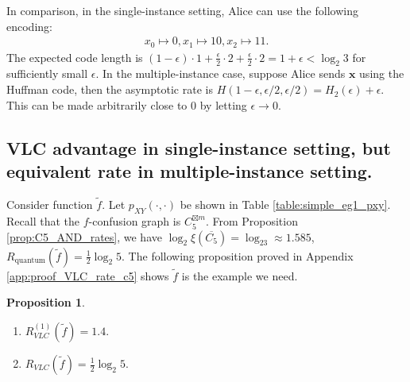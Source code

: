 \documentclass[journal, onecolumn, draftcls]{IEEEtran}
\theoremstyle{definition}
\newtheorem{proposition}{Proposition}
\newcommand{\bfx}{\mathbf{x}}
\newcommand{\aditya}[1]{\marginpar{+}{\bf Aditya's remark}: {\em #1}}
\begin{document}
In comparison, in the single-instance setting, Alice can use the following encoding:
\begin{align*}
    x_0\mapsto 0, x_1\mapsto 10, x_2\mapsto 11. 
\end{align*}
The expected code length is $(1-\epsilon)\cdot 1 + \frac{\epsilon}{2}\cdot 2+ \frac{\epsilon}{2}\cdot 2 = 1+\epsilon < \log_2 3$ for sufficiently small $\epsilon$. In the multiple-instance case, suppose Alice sends $\bfx$ using the Huffman code, then the asymptotic rate is $H(1-\epsilon,\epsilon/2,\epsilon/2) = H_2(\epsilon) + \epsilon$. This can be made arbitrarily close to $0$ by letting $\epsilon \to 0$.

\subsection{VLC advantage in single-instance setting, but equivalent rate  in multiple-instance setting.\label{sec:VLC_C5_AND}}
Consider function $\tilde f$. Let $p_{XY}(\cdot,\cdot)$  be shown in Table \ref{table:simple_eg1_pxy}. Recall that the $f$-confusion graph is $C_5^{\boxtimes m}$. From Proposition \ref{prop:C5_AND_rates}, we have $\log_2\xi(\overline{C_5}) =\log_23\approx 1.585$, $R_{\text{quantum}}(\tilde f)  =\frac{1}{2}\log_2 5$. The following proposition proved in Appendix \ref{app:proof_VLC_rate_c5} shows $\tilde f$ is the example we need.
\begin{proposition}\label{prop:VLC_rate_c5_AND}
\begin{enumerate}
    \item $R^{(1)}_{VLC}(\tilde f) = 1.4$.
    \item $R_{VLC}(\tilde f)=\frac{1}{2}\log_2 5$.
\end{enumerate}
\end{proposition}


\end{document}
